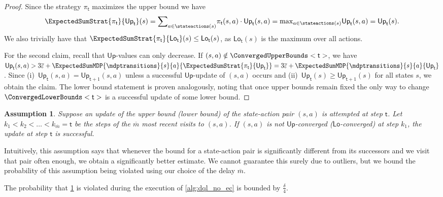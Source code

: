 \documentclass{article}
\newcommand{\strategy}{\pi}
\newcommand{\upperbound}{\mathsf{Up}}
\newcommand{\lowerbound}{\mathsf{Lo}}
\newcommand{\updatestep}{{\overline{\varepsilon}}}
\newcommand{\delay}{{\overline{m}}}
\newcommand{\algostep}{\mathsf{t}}
\newtheorem{assumption}{Assumption}
\begin{document}
\begin{proof}
	Since the strategy $\strategy_\algostep$ maximizes the upper bound we have
	\begin{equation*}
		\ExpectedSumStrat{\strategy_\algostep}{\upperbound_\algostep}(s) = {\sum}_{a \in \stateactions(s)} \strategy_\algostep(s, a) \cdot \upperbound_\algostep(s, a) = {\max}_{a \in \stateactions(s)} \upperbound_\algostep(s, a) = \upperbound_\algostep(s).
	\end{equation*}
	We also trivially have that $\ExpectedSumStrat{\strategy_\algostep}{\lowerbound_\algostep}(s) \leq \lowerbound_\algostep(s)$, as $\lowerbound_\algostep(s)$ is the maximum over all actions.

	For the second claim, recall that $\upperbound$-values can only decrease.
	If $(s, a) \notin \ConvergedUpperBounds<\algostep>$, we have $\upperbound_\algostep(s, a) > 3 \updatestep + \ExpectedSumMDP{\mdptransitions}{s}{a}{\ExpectedSumStrat{\strategy_\algostep}{\upperbound_\algostep}} = 3 \updatestep + \ExpectedSumMDP{\mdptransitions}{s}{a}{\upperbound_\algostep}$.
	Since (i)~$\upperbound_\algostep(s, a) = \upperbound_{\algostep + 1}(s, a)$ unless a successful $\upperbound$-update of $(s, a)$ occurs and (ii)~$\upperbound_\algostep(s) \geq \upperbound_{\algostep + 1}(s)$ for all states $s$, we obtain the claim.
	The lower bound statement is proven analogously, noting that once upper bounds remain fixed the only way to change $\ConvergedLowerBounds<\algostep>$ is a successful update of some lower bound. 
\end{proof}
\begin{assumption} \label{asm:dql_no_ec:converged_successful_update}
	Suppose an update of the upper bound (lower bound) of the state-action pair $(s, a)$ is attempted at step $\algostep$.
	Let $k_1 < k_2 < \ldots < k_\delay = \algostep$ be the steps of the $\delay$ most recent visits to $(s, a)$.
	If $(s, a)$ is not $\upperbound$-converged ($\lowerbound$-converged) at step $k_1$, the update at step $\algostep$ is successful.
\end{assumption}
Intuitively, this assumption says that whenever the bound for a state-action pair is significantly different from its successors and we visit that pair often enough, we obtain a significantly better estimate.
We cannot guarantee this surely due to outliers, but we bound the probability of this assumption being violated using our choice of the delay $\delay$.
\begin{lemma} \label{stm:dql_no_ec:converged_successful_update_probability}
	The probability that \cref{asm:dql_no_ec:converged_successful_update} is violated during the execution of \cref{alg:dql_no_ec} is bounded by $\frac{\delta}{4}$.
\end{lemma}
\end{document}
